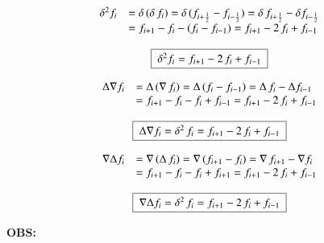 \begin{enumerar}
\begin{enumerar}
\item
\[
 \begin{array}{c}
  \begin{array}{ll}
   \delta^2 f_i & = \delta\,(\delta\,f_i) = \delta\,(f_{i+\frac{1}{2}} - f_{i-\frac{1}{2}}) = \delta\,f_{i+\frac{1}{2}} - \delta f_{i-\frac{1}{2}} \\
                & = f_{i+1} - f_i - (f_i - f_{i-1}) = f_{i+1} - 2\,f_i + f_{i-1} 
  \end{array} \\ \\
  \quadricular{\delta^2 f_i = f_{i+1} - 2\,f_i + f_{i-1}}
 \end{array}
\]

\item
\[
 \begin{array}{c}
  \begin{array}{ll}
   \Delta \nabla f_i & = \Delta\,(\nabla\,f_i) = \Delta\,(f_i - f_{i-1}) = \Delta\,f_i - \Delta f_{i-1} \\
                & = f_{i+1} - f_i - f_i + f_{i-1} = f_{i+1} - 2\,f_i + f_{i-1} 
  \end{array} \\ \\
  \quadricular{\Delta \nabla f_i = \delta^2\,f_i = f_{i+1} - 2\,f_i + f_{i-1}}
 \end{array}
\]

\item
\[
 \begin{array}{c}
  \begin{array}{ll}
   \nabla \Delta f_i & = \nabla\,(\Delta\,f_i) = \nabla\,(f_{i+1} - f_i) = \nabla\,f_{i+1} - \nabla f_i \\
                & = f_{i+1} - f_i - f_i + f_{i+1} = f_{i+1} - 2\,f_i + f_{i-1} 
  \end{array} \\ \\
  \quadricular{\nabla \Delta f_i = \delta^2\,f_i = f_{i+1} - 2\,f_i + f_{i-1}}
 \end{array}
\]

\end{enumerar}

\end{enumerar}

\textbf{OBS:}

